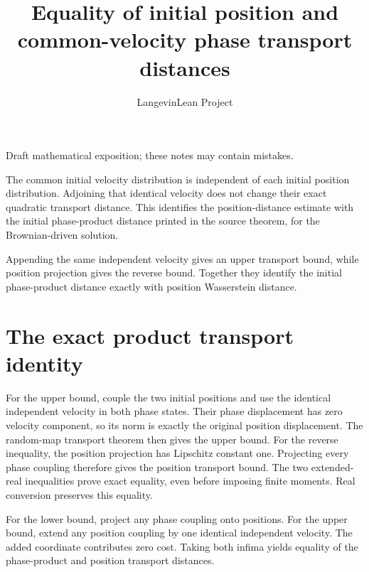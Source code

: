 \documentclass[11pt,a4paper]{article}
\title{\texorpdfstring{Equality of initial position and common-velocity phase transport distances}{Equality of initial position and common-velocity phase transport distances}}
\author{LangevinLean Project}
\date{}
\begin{document}
\maketitle
Draft mathematical exposition; these notes may contain mistakes.


The common initial velocity distribution is independent of each initial position distribution. Adjoining that identical velocity does not change their exact quadratic transport distance. This identifies the position-distance estimate with the initial phase-product distance printed in the source theorem, for the Brownian-driven solution.



Appending the same independent velocity gives an upper transport bound, while position projection gives the reverse bound. Together they identify the initial phase-product distance exactly with position Wasserstein distance.


\section{\texorpdfstring{The exact product transport identity}{The exact product transport identity}}


For the upper bound, couple the two initial positions and use the identical independent velocity in both phase states. Their phase displacement has zero velocity component, so its norm is exactly the original position displacement. The random-map transport theorem then gives the upper bound. For the reverse inequality, the position projection has Lipschitz constant one. Projecting every phase coupling therefore gives the position transport bound. The two extended-real inequalities prove exact equality, even before imposing finite moments. Real conversion preserves this equality.



For the lower bound, project any phase coupling onto positions. For the upper bound, extend any position coupling by one identical independent velocity. The added coordinate contributes zero cost. Taking both infima yields equality of the phase-product and position transport distances.
\end{document}
